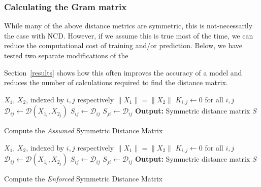 \documentclass[conference]{IEEEtran}
\begin{document}

\subsubsection{Calculating the Gram matrix}
\label{symmetry}
While many of the above distance metrics are symmetric, this is not-necessarily the case with NCD. However, if we assume this is true most of the time, we can reduce the computational cost of training and/or prediction. Below, we have tested two separate modifications of the 

 Section~\ref{results} shows how this often improves the accuracy of a model and reduces the number of calculations required to find the distance matrix.



\begin{algorithm}
    \begin{algorithmic}
        \Require $X_1$, $X_2$, indexed by $i,j$ respectively
        \Ensure $ \| X_1 \| = \| X_2 \| $
        \State $K_{i,j} \gets 0$ for all $i, j$
            \State $\mathcal{D}_{ij} \gets \mathcal{D}(X_{1_i}, X_{2_j})$
            \State $S_{ij} \gets \mathcal{D}_{ij}$
            \State $S_{ji} \gets \mathcal{D}_{ij}$
        \State \textbf{Output:} Symmetric distance matrix $S$
    \end{algorithmic}
    \caption{Compute the \textit{Assumed} Symmetric Distance Matrix}
    \label{alg:assumed_symmetry}
\end{algorithm}

\begin{algorithm}
    \begin{algorithmic}
        \Require $X_1$, $X_2$, indexed by $i,j$ respectively
        \Ensure $ \| X_1 \| = \| X_2 \| $
        \State $K_{i,j} \gets 0$ for all $i, j$
            \State $\mathcal{D}_{ij} \gets \mathcal{D}(X_{1_i}, X_{2_j})$
            \State $S_{ij} \gets \mathcal{D}_{ij}$
            \State $S_{ji} \gets \mathcal{D}_{ij}$
        \State \textbf{Output:} Symmetric distance matrix $S$
    \end{algorithmic}
    \caption{Compute the \textit{Enforced} Symmetric Distance Matrix}
    \label{alg:enforced_symmetry}
\end{algorithm}
\end{document}
